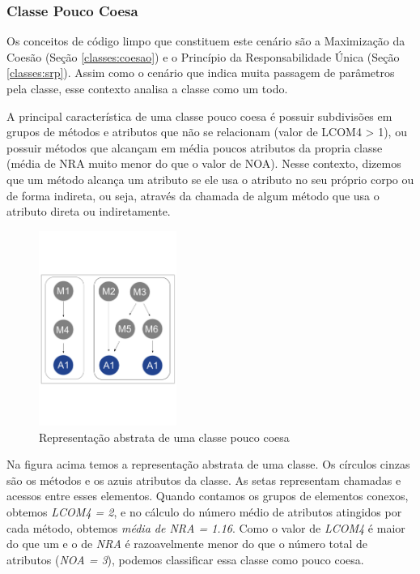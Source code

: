                                       
                      

\subsubsection{Classe Pouco Coesa}
    
Os conceitos de código limpo que constituem este cenário são a Maximização da Coesão (Seção \ref{classes:coesao}) e o Princípio da Responsabilidade Única (Seção \ref{classes:srp}). Assim como o cenário que indica muita passagem de parâmetros pela classe, esse contexto analisa a classe como um todo.
	
A principal característica de uma classe pouco coesa é possuir subdivisões em grupos de métodos e atributos que não se relacionam (valor de LCOM4 > 1), ou possuir métodos que alcançam em média poucos atributos da propria classe (média de NRA muito menor do que o valor de NOA). Nesse contexto, dizemos que um método alcança um atributo se ele usa o atributo no seu próprio corpo ou de forma indireta, ou seja, através da chamada de algum método que usa o atributo direta ou indiretamente.


\begin{figure}[htb]
	\centering
	\includegraphics[trim = 0mm 50mm 0mm 60mm, clip, width=0.4\textwidth]{codigos/exemplos_para_os_cenarios/classe_pouco_coesa.png}
	\caption{Representação abstrata de uma classe pouco coesa}
	\label{classe_pouco_coesa}
\end{figure}
   
    
Na figura acima temos a representação abstrata de uma classe. Os círculos cinzas são os métodos e os azuis atributos da classe. As setas representam chamadas e acessos entre esses elementos. Quando contamos os grupos de elementos conexos, obtemos \textit{LCOM4 = 2}, e no cálculo do número médio de atributos atingidos por cada método, obtemos \textit{média de NRA = 1.16}. Como o valor de \textit{LCOM4} é maior do que um e o de \textit{NRA} é razoavelmente menor do que o número total de atributos (\textit{NOA = 3}), podemos classificar essa classe como pouco coesa.                  
    
